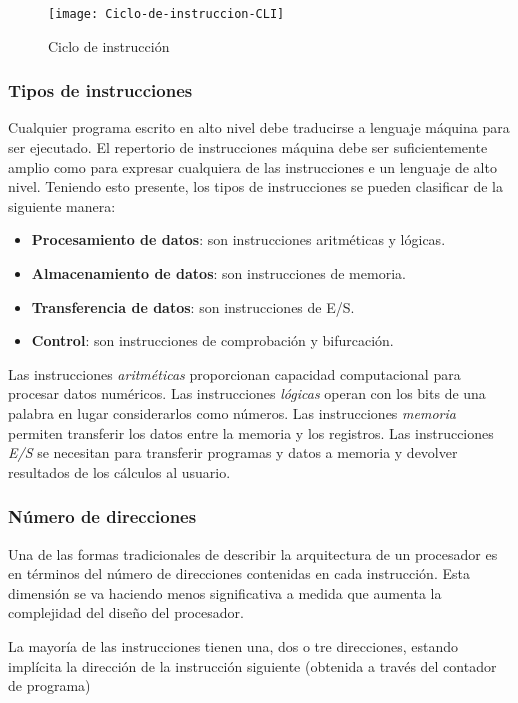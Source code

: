 \begin{subs}
  \begin{figure}[H]
    \centering
    \texttt{[image: Ciclo-de-instruccion-CLI]}
    \caption{Ciclo de instrucción}
  \end{figure}

  \subsubsection{Tipos de instrucciones}

  Cualquier programa escrito en alto nivel debe traducirse a lenguaje máquina para ser ejecutado. El repertorio de instrucciones máquina debe ser suficientemente amplio como para expresar cualquiera de las instrucciones e un lenguaje de alto nivel. Teniendo esto presente, los tipos de instrucciones se pueden clasificar de la siguiente manera:
  \begin{itemize}
    \item \textbf{Procesamiento de datos}: son instrucciones aritméticas y lógicas.
    \item \textbf{Almacenamiento de datos}: son instrucciones de memoria.
    \item \textbf{Transferencia de datos}: son instrucciones de E/S.
    \item \textbf{Control}: son instrucciones de comprobación y bifurcación.
  \end{itemize}

  Las instrucciones \textit{aritméticas} proporcionan capacidad computacional para procesar datos numéricos. Las instrucciones \textit{lógicas} operan con los bits de una palabra en lugar considerarlos como números. Las instrucciones \textit{memoria} permiten transferir los datos entre la memoria y los registros. Las instrucciones \textit{E/S} se necesitan para transferir programas y datos a memoria y devolver resultados de los cálculos al usuario.

  \subsubsection{Número de direcciones}

  Una de las formas tradicionales de describir la arquitectura de un procesador es en términos del número de direcciones contenidas en cada instrucción. Esta dimensión se va haciendo menos significativa a medida que aumenta la complejidad del diseño del procesador.

  La mayoría de las instrucciones tienen una, dos o tre direcciones, estando implícita la dirección de la instrucción siguiente (obtenida a través del contador de programa)


\end{subs}

